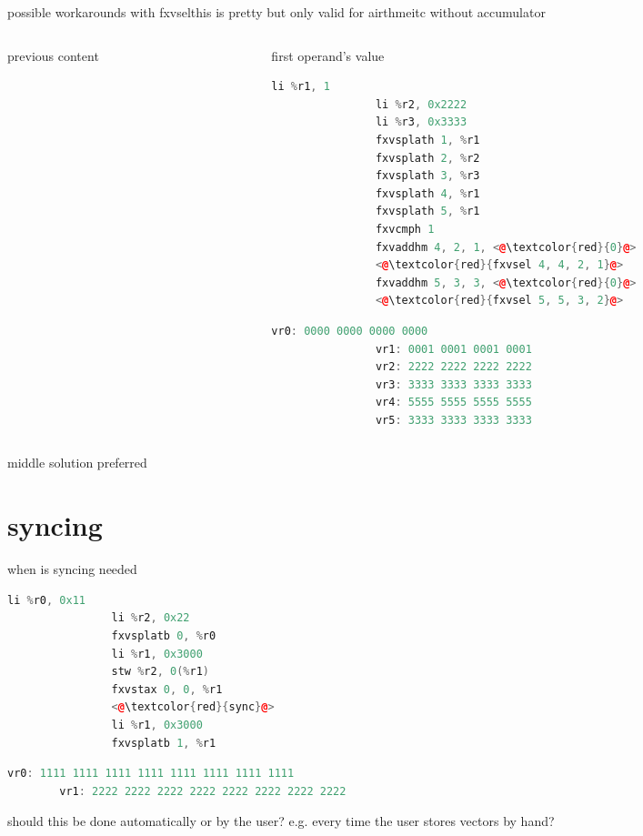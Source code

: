 \documentclass[10pt]{beamer}
\begin{document}
\begin{frame}[fragile]{possible workarounds with fxvsel}{this is pretty but only valid for airthmeitc without accumulator}
\begin{columns}[t]
\begin{column}{0.3\textwidth}
\begin{block}{previous content}
\begin{lstlisting}[language=C++,basicstyle=\fontsize{5}{7}\selectfont\ttfamily,keywordstyle=\color{red}]
				\end{lstlisting}
			\end{block}
    	\end{column}
    	\begin{column}{0.3\textwidth}
    		\begin{block}{first operand's value}
    		\begin{lstlisting}[language=C++,basicstyle=\ttfamily\scriptsize,keywordstyle=\color{red}]
				li %r1, 1
				li %r2, 0x2222
				li %r3, 0x3333
				fxvsplath 1, %r1
				fxvsplath 2, %r2
				fxvsplath 3, %r3
				fxvsplath 4, %r1
				fxvsplath 5, %r1
				fxvcmph 1
				fxvaddhm 4, 2, 1, <@\textcolor{red}{0}@>
				<@\textcolor{red}{fxvsel 4, 4, 2, 1}@>
				fxvaddhm 5, 3, 3, <@\textcolor{red}{0}@>
				<@\textcolor{red}{fxvsel 5, 5, 3, 2}@>
	\end{lstlisting}
      			\begin{lstlisting}[language=C++,basicstyle=\fontsize{5}{7}\selectfont\ttfamily,keywordstyle=\color{red}]
				vr0: 0000 0000 0000 0000
				vr1: 0001 0001 0001 0001
				vr2: 2222 2222 2222 2222
				vr3: 3333 3333 3333 3333
				vr4: 5555 5555 5555 5555
				vr5: 3333 3333 3333 3333
				\end{lstlisting}
			\end{block}
    	\end{column}
	\end{columns}
	
middle solution preferred
\end{frame}


\section{syncing}
\begin{frame}[fragile]{when is syncing needed}{}
			\begin{lstlisting}[language=C++,basicstyle=\ttfamily\scriptsize,keywordstyle=\color{red}]
				li %r0, 0x11
				li %r2, 0x22
				fxvsplatb 0, %r0
				li %r1, 0x3000
				stw %r2, 0(%r1)
				fxvstax 0, 0, %r1
				<@\textcolor{red}{sync}@>
				li %r1, 0x3000
				fxvsplatb 1, %r1
			\end{lstlisting}
      		\begin{lstlisting}[language=C++,basicstyle=\fontsize{5}{7}\selectfont\ttfamily,keywordstyle=\color{red}]
      		vr0: 1111 1111 1111 1111 1111 1111 1111 1111
		vr1: 2222 2222 2222 2222 2222 2222 2222 2222
			\end{lstlisting}
			should this be done automatically or by the user? e.g. every time the user stores vectors by hand?
\end{frame}
\end{document}
